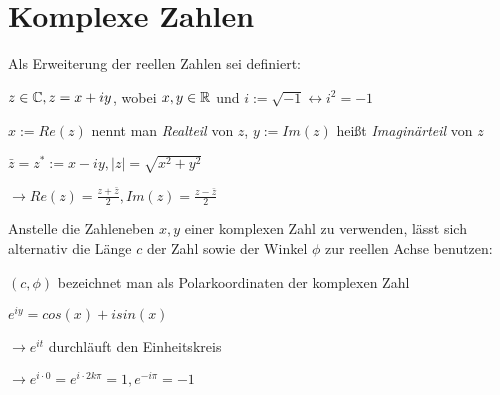 \section{Komplexe Zahlen}

\begin{definition}
	Als Erweiterung der reellen Zahlen sei definiert:
	\begin{description}[noitemsep]
		\item $z \in \mathbb{C}, z = x + iy$, wobei $x,y \in \mathbb{R}$ und $i := \sqrt{-1} \leftrightarrow i^2 = -1$
		\item $x := Re(z)$ nennt man \emph{Realteil} von $z$, $y := Im(z)$ heißt \emph{Imaginärteil} von $z$
		\item $\bar{z} = z^* := x - iy, |z| = \sqrt{x^2 + y^2}$
		\item $\rightarrow Re(z) = \frac{z + \bar{z}}{2}, Im(z) = \frac{z - \bar{z}}{2}$
	\end{description}
\end{definition}

\begin{definition}[Polardarstellung]
	Anstelle die Zahleneben $x,y$ einer komplexen Zahl zu verwenden, lässt sich alternativ die Länge $c$ der Zahl sowie der Winkel $\phi$ zur reellen Achse benutzen:
	
	
	$(c, \phi) $ bezeichnet man als Polarkoordinaten der komplexen Zahl
	
\end{definition}

\begin{satz}
	$e^{iy} = cos(x) + i sin(x)$
	
	\begin{description}[noitemsep]
		\item $\rightarrow e^{it}$ durchläuft den Einheitskreis 
		\item $\rightarrow e^{i \cdot 0} = e^{i \cdot 2k\pi} = 1, e^{-i\pi} = -1$
	\end{description}
	
\end{satz}


